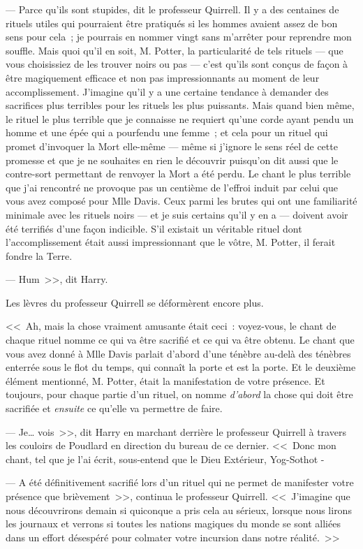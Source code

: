 --- Parce qu'ils sont stupides, dit le professeur Quirrell. Il y a des centaines de rituels utiles qui pourraient être pratiqués si les hommes avaient assez de bon sens pour cela~; je pourrais en nommer vingt sans m'arrêter pour reprendre mon souffle. Mais quoi qu'il en soit, M. Potter, la particularité de tels rituels — que vous choisissiez de les trouver noirs ou pas — c'est qu'ils sont conçus de façon à être magiquement efficace et non pas impressionnants au moment de leur accomplissement. J'imagine qu'il y a une certaine tendance à demander des sacrifices plus terribles pour les rituels les plus puissants. Mais quand bien même, le rituel le plus terrible que je connaisse ne requiert qu'une corde ayant pendu un homme et une épée qui a pourfendu une femme~; et cela pour un rituel qui promet d'invoquer la Mort elle-même — même si j'ignore le sens réel de cette promesse et que je ne souhaites en rien le découvrir puisqu'on dit aussi que le contre-sort permettant de renvoyer la Mort a été perdu. Le chant le plus terrible que j'ai rencontré ne provoque pas un centième de l'effroi induit par celui que vous avez composé pour Mlle Davis. Ceux parmi les brutes qui ont une familiarité minimale avec les rituels noirs — et je suis certains qu'il y en a — doivent avoir été terrifiés d'une façon indicible. S'il existait un véritable rituel dont l'accomplissement était aussi impressionnant que le vôtre, M. Potter, il ferait fondre la Terre.

--- Hum~>>, dit Harry.

Les lèvres du professeur Quirrell se déformèrent encore plus.

<<~Ah, mais la chose vraiment amusante était ceci~: voyez-vous, le chant de chaque rituel nomme ce qui va être sacrifié et ce qui va être obtenu. Le chant que vous avez donné à Mlle Davis parlait d'abord d'une ténèbre au-delà des ténèbres enterrée sous le flot du temps, qui connaît la porte et est la porte. Et le deuxième élément mentionné, M. Potter, était la manifestation de votre présence. Et toujours, pour chaque partie d'un rituel, on nomme \emph{d'abord} la chose qui doit être sacrifiée et \emph{ensuite} ce qu'elle va permettre de faire.

--- Je… vois~>>, dit Harry en marchant derrière le professeur Quirrell à travers les couloirs de Poudlard en direction du bureau de ce dernier. <<~Donc mon chant, tel que je l'ai écrit, sous-entend que le Dieu Extérieur, Yog-Sothot -

--- A été définitivement sacrifié lors d'un rituel qui ne permet de manifester votre présence que brièvement~>>, continua le professeur Quirrell. <<~J'imagine que nous découvrirons demain si quiconque a pris cela au sérieux, lorsque nous lirons les journaux et verrons si toutes les nations magiques du monde se sont alliées dans un effort désespéré pour colmater votre incursion dans notre réalité.~>>

